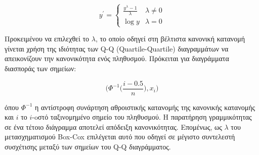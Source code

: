 \begin{equation}
y^{'}=
\begin{cases}
\frac{y^{\lambda} -1}{\lambda} &  \lambda \neq 0\\
\log{y} & \lambda = 0
\end{cases}
\end{equation} 

Προκειμένου να επιλεχθεί το $\lambda$, το οποίο οδηγεί στη βέλτιστα κανονική κατανομή γίνεται χρήση της ιδιότητας των Q-Q (Quartile-Quartile) διαγραμμάτων να απεικονίζουν την κανονικότητα ενός πληθυσμού. Πρόκειται για διαγράμματα διασποράς των σημείων:

\begin{equation}
\Big( \Phi^{-1} \big(\frac{i-0.5}{n} \big), x_{i} \Big)
\end{equation} 
 
όπου $\Phi^{-1}$ η αντίστροφη συνάρτηση αθροιστικής κατανομής της κανονικής κατανομής και $i$ το $i$-oστό ταξινομημένο σημείο του πληθυσμού. Η παρατήρηση γραμμικότητας σε ένα τέτοιο διάγραμμα αποτελεί απόδειξη κανονικότητας. Επομένως, ως $\lambda$ του μετασχηματισμού Box-Cox επιλέγεται αυτό που οδηγεί σε μέγιστο συντελεστή συσχέτισης μεταξύ των σημείων του Q-Q διαγράμματος.

